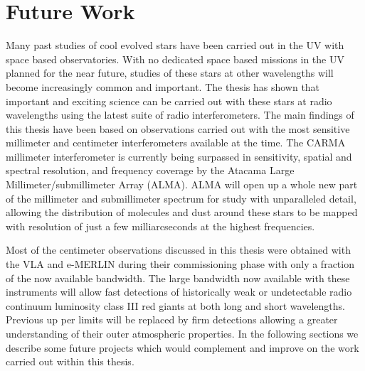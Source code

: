 \section{Future Work}\label{sec:8.2}
Many past studies of cool evolved stars have been carried out in the UV with space based observatories. With no dedicated space based missions in the UV planned for the near future, studies of these stars at other wavelengths will become increasingly common and important. The thesis has shown that important and exciting science can be carried out with these stars at radio wavelengths using the latest suite of radio interferometers. The main findings of this thesis have been based on observations carried out with the most sensitive millimeter and centimeter interferometers available at the time. The CARMA millimeter interferometer is currently being surpassed in sensitivity, spatial and spectral resolution, and frequency coverage by the Atacama Large Millimeter/submillimeter Array (ALMA). ALMA will open up a whole new part of the millimeter and submillimeter spectrum for study with  unparalleled detail, allowing the distribution of molecules and dust around these stars to be mapped with resolution of just a few milliarcseconds at the highest frequencies. 

Most of the centimeter observations discussed in this thesis were obtained with the VLA and e-MERLIN during their commissioning phase with only a fraction of the now available bandwidth. The large bandwidth now available with these instruments will  allow fast detections of historically weak or undetectable radio continuum luminosity class III red giants at both long and short wavelengths. Previous up per limits will be replaced by firm detections allowing a greater understanding of their outer atmospheric properties. In the following sections we describe some future projects which would complement and improve on the work carried out within this thesis.

